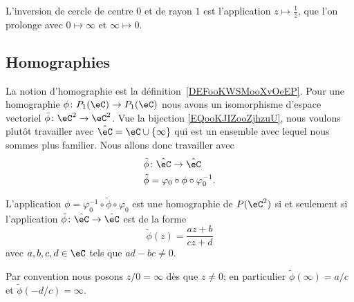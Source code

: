 \begin{example}
	L'inversion de cercle de centre \( 0\) et de rayon \( 1\) est l'application \( z\mapsto \frac{1}{ \bar z }\), que l'on prolonge avec \( 0\mapsto \infty\) et \( \infty\mapsto 0\).
\end{example}

\subsection{Homographies}

La notion d'homographie est la définition~\ref{DEFooKWSMooXvOeEP}. Pour une homographie \( \phi\colon P_1(\eC)\to P_1(\eC)\) nous avons un isomorphisme d'espace vectoriel \( \bar\phi\colon \eC^2\to \eC^2\). Vue la bijection \eqref{EQooKJIZooZjhzuU}, nous voulons plutôt travailler avec \( \hat \eC=\eC\cup\{ \infty \}\) qui est un ensemble avec lequel nous sommes plus familier. Nous allons donc travailler avec
\begin{equation}
	\begin{aligned}
		\tilde \phi & \colon \hat \eC\to \hat \eC             \\
		\tilde \phi & =\varphi_0\circ\phi\circ\varphi_0^{-1}.
	\end{aligned}
\end{equation}

\begin{proposition}     \label{PROPooTZJBooPpowOo}
	L'application \( \phi=\varphi_0^{-1}\circ\tilde \phi\circ\varphi_0\) est une homographie de \( P(\eC^2)\) si et seulement si l'application \( \tilde \phi\colon \hat \eC\to \hat \eC\) est de la forme
	\begin{equation}
		\tilde \phi(z)=\frac{ az+b }{ cz+d }
	\end{equation}
	avec \( a,b,c,d\in \eC\) tels que \( ad-bc\neq 0\).

	Par convention nous posons \( z/0=\infty\) dès que \( z\neq 0\); en particulier \( \tilde \phi(\infty)=a/c\) et \( \tilde \phi(-d/c)=\infty\).
\end{proposition}

